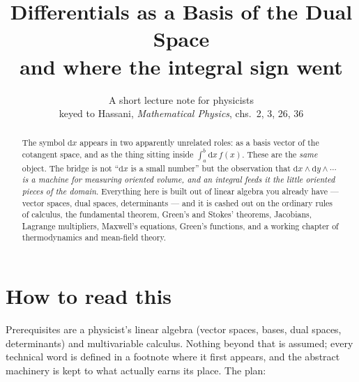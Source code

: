 \documentclass[10pt,a4paper]{article}
\title{\bfseries Differentials as a Basis of the Dual Space\\[2pt]
\large and where the integral sign went}
\author{A short lecture note for physicists\\[2pt]
\small keyed to Hassani, \emph{Mathematical Physics}, chs.\ 2, 3, 26, 36}
\date{}
\newcommand{\dd}{\mathrm{d}}
\theoremstyle{plain}
\theoremstyle{definition}
\numberwithin{equation}{section}
\begin{document}
\maketitle
\vspace{-2.2em}

\begin{abstract}\noindent\small
The symbol $\dd x$ appears in two apparently unrelated roles: as a basis vector of the
cotangent space, and as the thing sitting inside $\int_a^b\dd x\,f(x)$. These are the
\emph{same} object. The bridge is not ``$\dd x$ is a small number'' but the observation that
\emph{$\dd x\wedge\dd y\wedge\cdots$ is a machine for measuring oriented volume, and an
integral feeds it the little oriented pieces of the domain}. Everything here is built out of
linear algebra you already have --- vector spaces, dual spaces, determinants --- and it is
cashed out on the ordinary rules of calculus, the fundamental theorem, Green's and Stokes'
theorems, Jacobians, Lagrange multipliers, Maxwell's equations, Green's functions, and a
working chapter of thermodynamics and mean-field theory.
\end{abstract}

\section*{How to read this}

\noindent
Prerequisites are a physicist's linear algebra (vector spaces, bases, dual spaces,
determinants) and multivariable calculus. Nothing beyond that is assumed; every technical word
is defined in a footnote where it first appears, and the abstract machinery is kept to what
actually earns its place. The plan:
\end{document}
